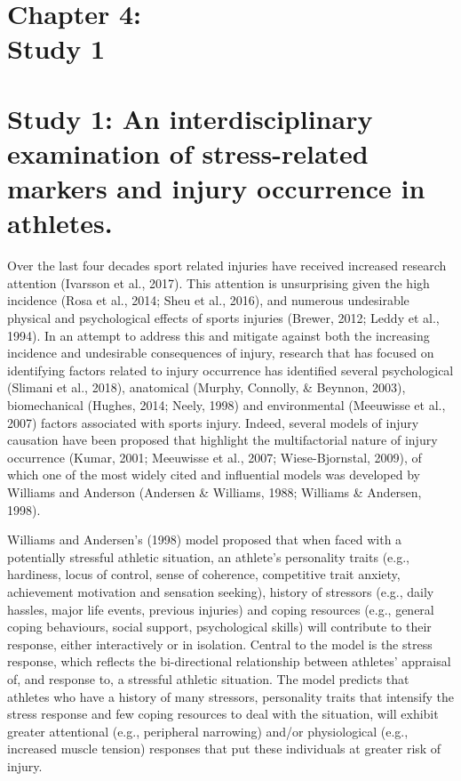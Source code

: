 \documentclass[man,floatsintext]{apa6}
\begin{document}
\vspace*{3cm}

\section[Chapter 4: Study 1]{\Large{Chapter 4: \\ Study 1}}

\clearpage

\hypertarget{study-1-an-interdisciplinary-examination-of-stress-related-markers-and-injury-occurrence-in-athletes.}{%
\section{Study 1: An interdisciplinary examination of stress-related markers and injury occurrence in athletes.}\label{study-1-an-interdisciplinary-examination-of-stress-related-markers-and-injury-occurrence-in-athletes.}}

Over the last four decades sport related injuries have received increased research attention (Ivarsson et al., 2017).
This attention is unsurprising given the high incidence (Rosa et al., 2014; Sheu et al., 2016),
and numerous undesirable physical and psychological effects of sports injuries (Brewer, 2012; Leddy et al., 1994).
In an attempt to address this and mitigate against both the increasing incidence and undesirable consequences of injury, research that has focused on identifying factors related to injury occurrence
has identified several psychological (Slimani et al., 2018),
anatomical (Murphy, Connolly, \& Beynnon, 2003),
biomechanical (Hughes, 2014; Neely, 1998)
and environmental (Meeuwisse et al., 2007)
factors associated with sports injury.
Indeed, several models of injury causation have been proposed that highlight the multifactorial nature of injury occurrence (Kumar, 2001; Meeuwisse et al., 2007; Wiese-Bjornstal, 2009),
of which one of the most widely cited and influential models was developed by Williams and Anderson (Andersen \& Williams, 1988; Williams \& Andersen, 1998).

Williams and Andersen's (1998) model proposed that when faced with a potentially stressful athletic situation, an athlete's personality traits (e.g., hardiness, locus of control, sense of coherence, competitive trait anxiety, achievement motivation and sensation seeking), history of stressors (e.g., daily hassles, major life events, previous injuries) and coping resources (e.g., general coping behaviours, social support, psychological skills) will contribute to their response, either interactively or in isolation.
Central to the model is the stress response, which reflects the bi-directional relationship between athletes' appraisal of, and response to, a stressful athletic situation. The model predicts that athletes who have a history of many stressors, personality traits that intensify the stress response and few coping resources to deal with the situation, will exhibit greater attentional (e.g., peripheral narrowing) and/or physiological (e.g., increased muscle tension) responses that put these individuals at greater risk of injury.
\end{document}
